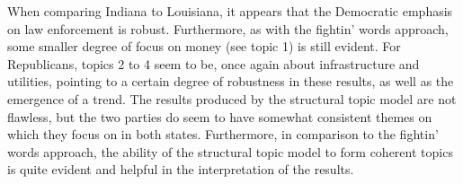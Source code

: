 \documentclass[11pt]{article}
\begin{document}
When comparing Indiana to Louisiana, it appears that the Democratic emphasis on law enforcement is robust. Furthermore, as with the fightin' words approach, some smaller degree of focus on money (see topic 1) is still evident. For Republicans, topics 2 to 4 seem to be, once again about infrastructure and utilities, pointing to a certain degree of robustness in these results, as well as the emergence of a trend. The results produced by the structural topic model are not flawless, but the two parties do seem to have somewhat consistent themes on which they focus on in both states. Furthermore, in comparison to the fightin' words approach, the ability of the structural topic model to form coherent topics is quite evident and helpful in the interpretation of the results.





\end{document}
